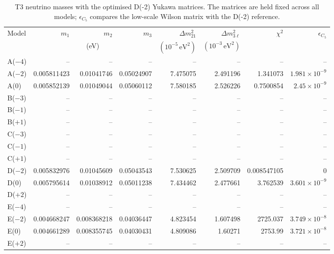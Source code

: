 \begin{table}[p]
\centering
\caption{T3 neutrino masses with the optimised D(-2) Yukawa matrices. The matrices are held fixed across all models; $\epsilon_{C_5}$ compares the low-scale Wilson matrix with the D(-2) reference.}
\label{tab:appC_Dm2_masses}
\begingroup
\footnotesize
\setlength{\tabcolsep}{3.2pt}
\begin{tabular}{lrrrrrrr}
\hline
Model & $m_1$ & $m_2$ & $m_3$ & $\Delta m^2_{21}$ & $\Delta m^2_{3\ell}$ & $\chi^2$ & $\epsilon_{C_5}$ \\
 & \multicolumn{3}{c}{(eV)} & $(10^{-5}\,\mathrm{eV}^2)$ & $(10^{-3}\,\mathrm{eV}^2)$ &  &  \\
\hline
A($-4$) & -- & -- & -- & -- & -- & -- & -- \\
A($-2$) & 0.005811423 & 0.01041746 & 0.05024907 & 7.475075 & 2.491196 & 1.341073 & $1.981\times10^{-9}$ \\
A($0$) & 0.005852139 & 0.01049044 & 0.05060112 & 7.580185 & 2.526226 & 0.7500854 & $2.45\times10^{-9}$ \\
B($-3$) & -- & -- & -- & -- & -- & -- & -- \\
B($-1$) & -- & -- & -- & -- & -- & -- & -- \\
B($+1$) & -- & -- & -- & -- & -- & -- & -- \\
C($-3$) & -- & -- & -- & -- & -- & -- & -- \\
C($-1$) & -- & -- & -- & -- & -- & -- & -- \\
C($+1$) & -- & -- & -- & -- & -- & -- & -- \\
D($-2$) & 0.005832976 & 0.01045609 & 0.05043543 & 7.530625 & 2.509709 & 0.008547105 & 0 \\
D($0$) & 0.005795614 & 0.01038912 & 0.05011238 & 7.434462 & 2.477661 & 3.762539 & $3.601\times10^{-9}$ \\
D($+2$) & -- & -- & -- & -- & -- & -- & -- \\
E($-4$) & -- & -- & -- & -- & -- & -- & -- \\
E($-2$) & 0.004668247 & 0.008368218 & 0.04036447 & 4.823454 & 1.607498 & 2725.037 & $3.749\times10^{-8}$ \\
E($0$) & 0.004661289 & 0.008355745 & 0.04030431 & 4.809086 & 1.60271 & 2753.99 & $3.721\times10^{-8}$ \\
E($+2$) & -- & -- & -- & -- & -- & -- & -- \\
\hline
\end{tabular}
\endgroup
\end{table}
